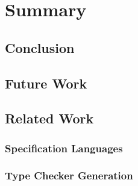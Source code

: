 \documentclass[a4paper,twoside]{report}
\begin{document}
\chapter{Summary}
\section{Conclusion}
\section{Future Work}
\section{Related Work}
\subsection{Specification Languages}
\subsection{Type Checker Generation}


\end{document}
